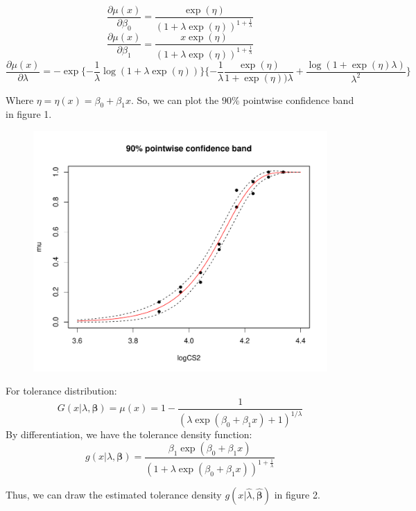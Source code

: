 \documentclass[12pt]{article}
\begin{document}
$$\frac{\partial \mu(x)}{\partial \beta_0}=\frac{\exp(\eta)}{(1+\lambda \exp(\eta))^{1+\frac{1}{\lambda}}}$$
$$\frac{\partial \mu(x)}{\partial \beta_1}=\frac{x \exp(\eta)}{(1+\lambda \exp(\eta))^{1+\frac{1}{\lambda}}}$$
$$\frac{\partial \mu(x)}{\partial \lambda} = -\exp\{-\frac{1}{\lambda}\log(1+\lambda \exp(\eta))\}
\{-\frac{1}{\lambda} \frac{\exp(\eta)}{1+\exp(\eta)) \lambda} +  \frac{\log(1+\exp(\eta)\lambda)}{\lambda^2} \}$$

Where $\eta=\eta(x)=\beta_{0}+\beta_{1}x$. So, we can plot the $90\%$ pointwise confidence band in figure 1.

\begin{figure}[h] 
\includegraphics[width=1.0\textwidth]{Rplot1.pdf}
\caption{}
\end{figure}

For tolerance distribution:
$$G(x|\lambda, \pmb{\beta}) = \mu(x) = 1 - \frac{1}{(\lambda \exp(\beta_0 + \beta_1 x)+1)^{1/\lambda}}$$
By differentiation, we have the tolerance density function:
$$g(x|\lambda, \pmb{\beta}) = \frac{\beta_1 \exp(\beta_0 + \beta_1 x)}{(1 + \lambda \exp(\beta_0 + \beta_1 x))^{1+\frac{1}{\lambda}} }$$

Thus, we can draw the estimated tolerance density $g(x|\hat{\lambda}, \pmb{\hat{\beta}})$ in figure 2.
\end{document}
